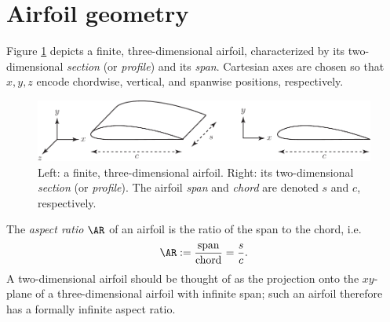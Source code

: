 \documentclass[10pt,fleqn,reqno]{article}
\newcommand\ie{i.e.~}
\newcommand\defn[1]{\emph{#1}}
\begin{document}
\section{Airfoil geometry}
Figure \ref{fig:airfoil} depicts a finite, three-dimensional airfoil, characterized by its two-dimensional \defn{section} (or \defn{profile}) and its \defn{span}.  Cartesian axes are chosen so that $x,y,z$ encode chordwise, vertical, and spanwise positions, respectively.
\begin{figure}[H]
\begin{center}
\includegraphics[scale=.8]{Figures/airfoil.pdf}
\caption{Left: a finite, three-dimensional airfoil.  Right: its two-dimensional \defn{section} (or \defn{profile}).  The airfoil \defn{span} and \defn{chord} are denoted $s$ and $c$, respectively.}\label{fig:airfoil}
\end{center}
\end{figure}
The \defn{aspect ratio} $\AR$ of an airfoil is the ratio of the span to the chord, \ie \[\AR:=\frac{\text{span}}{\text{chord}}=\frac{s}{c}.\]  A two-dimensional airfoil should be thought of as the projection onto the $xy$-plane of a three-dimensional airfoil with infinite span; such an airfoil therefore has a formally infinite aspect ratio.
\end{document}
